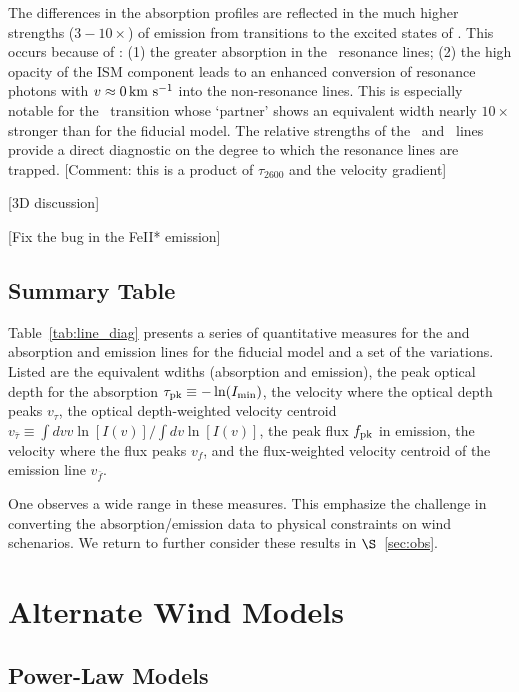 \documentclass[12pt,preprint]{aastex}
\begin{document}
The differences in the  absorption profiles are reflected
in the much higher strengths ($3-10\times$) of emission from
transitions to the excited states of \aconfig.   This occurs because
of : (1) the greater absorption in the \feiid\
resonance lines; (2) the high opacity of the ISM component leads to
an enhanced conversion of resonance photons with $v \approx 0\, {\rm km~s^{-1}}$
into the non-resonance lines.  This is especially notable for the
\feiib\ transition whose `partner' shows an equivalent width nearly
$10\times$ stronger than for the fiducial model.  The relative
strengths of the \feiib\ and \feiie\ lines provide a direct
diagnostic on the degree to which the resonance lines are trapped.
[Comment:  this is a product of $\tau_{2600}$ and the velocity
gradient]

[3D discussion]

[Fix the bug in the FeII* emission]

\subsection{Summary Table}

Table~\ref{tab:line_diag} presents a series of quantitative measures
for the \ion{Mg}{2} and \ion{Fe}{2} absorption and emission lines for
the fiducial model and a set of the variations.  Listed are the
equivalent wdiths (absorption and emission), the peak optical depth
for the absorption $\tau_{\rm pk} \equiv -\ln(I_{\rm min})$, the
velocity where the optical depth peaks $v_\tau$, the optical
depth-weighted velocity centroid $v_{\bar \tau} \equiv \int dv v
\ln[I(v)] / \int dv \ln[I(v)]$, the peak flux $f_{\rm pk}$ in
emission, the velocity where the flux peaks $v_f$, and the
flux-weighted velocity centroid of the emission line $v_{\bar f}$.

One observes a wide range in these measures.  This emphasize the
challenge in converting the absorption/emission data to physical
constraints on wind schenarios.  We return to further consider these
results in $\S$~\ref{sec:obs}.

\section{Alternate Wind Models}

\subsection{Power-Law Models}
\label{sec:power}
\end{document}
